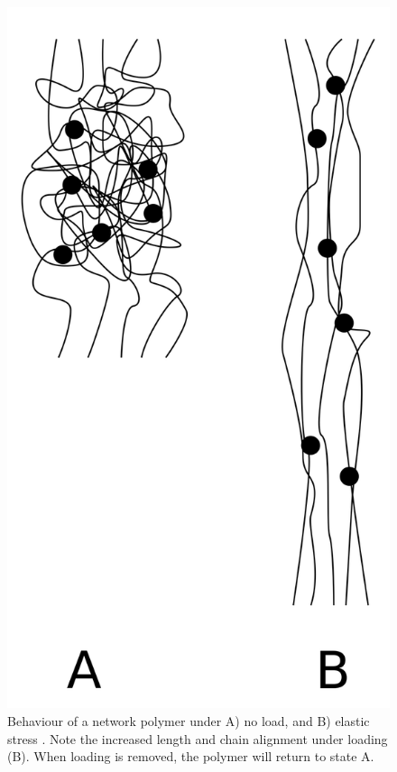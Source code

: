 \documentclass{report}
\begin{document}
\begin{figure}[h]
    \label{fig:latch}
    \centering
    \includegraphics[width=\textwidth/4]{images/elastomer.png}
    \hfill
    \caption{Behaviour of a network polymer under A) no load, and B) elastic stress \cite{elastomer}.
    Note the increased length and chain alignment under loading (B). When loading is removed, the 
    polymer will return to state A.}
\end{figure}
\end{document}
